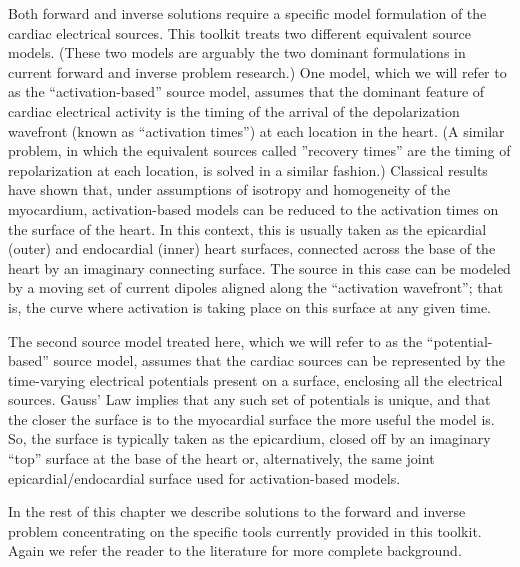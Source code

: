 \documentclass[fleqn,11pt,openany]{book}
\begin{document}
Both forward and inverse solutions require a specific model formulation of
the cardiac electrical sources. This toolkit treats two different
equivalent source models. (These two models are arguably the two dominant
formulations in current forward and inverse problem research.) One model,
which we will refer to as the ``activation-based'' source model, assumes
that the dominant feature of cardiac electrical activity is the timing of
the arrival of the depolarization wavefront (known as ``activation times'')
at each location in the heart. (A similar problem, in which the equivalent sources called ''recovery times'' are the timing of
repolarization at each location, is solved in a
similar fashion.) Classical
results have shown that, under assumptions of isotropy and homogeneity of
the myocardium, activation-based models can be reduced to the activation
times on the surface of the heart. In this context, this is usually taken as
the epicardial (outer) and endocardial (inner) heart surfaces, connected
across the base of the heart by an imaginary connecting surface. The source
in this case can be modeled by a moving set of current dipoles aligned
along the ``activation wavefront''; that is, the curve where activation is
taking place on this surface at any given time.

The second source model treated here, which we will refer to as the
``potential-based'' source model, assumes that the cardiac sources can be
represented by the time-varying electrical potentials present on a surface,
enclosing all the electrical sources. Gauss' Law implies that any such set
of potentials is unique, and that the closer the surface is to the myocardial
surface the more useful the model is. So, the surface is typically taken as
the epicardium, closed off by an imaginary ``top'' surface at the base of
the heart or, alternatively, the same joint epicardial/endocardial surface
used for activation-based models.

In the rest of this chapter we describe solutions to the forward and
inverse problem concentrating on the specific tools currently provided in
this toolkit. Again we refer the reader to the literature for more complete
background.
\end{document}
